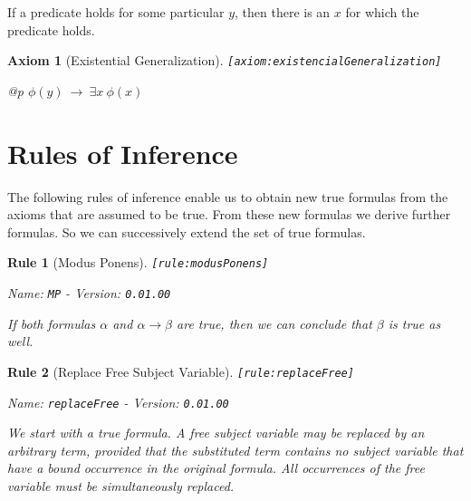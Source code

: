 \documentclass[a4paper,german,10pt,twoside]{book}
\newtheorem{ax}{Axiom}
\newtheorem{rul}{Rule}
\theoremstyle{definition}
\theoremstyle{remark}
\begin{document}
\par
If a predicate holds for some particular $y$, then there is an $x$ for which the predicate holds.

\begin{ax}[Existential Generalization]
\label{axiom:existencialGeneralization} \hypertarget{axiom:existencialGeneralization}{}
{\tt \tiny [\verb]axiom:existencialGeneralization]]}
\mbox{}
\begin{longtable}{{@{\extracolsep{\fill}}p{\linewidth}}}
\centering $\phi(y)\ \rightarrow\ \exists x\ \phi(x)$
\end{longtable}

\end{ax}


\section{Rules of Inference} \label{chapter5_section2} \hypertarget{chapter5_section2}{}
The following rules of inference enable us to obtain new true formulas from the axioms that are assumed to be true. From these new formulas we derive further formulas. So we can successively extend the set of true formulas.

\begin{rul}[Modus Ponens]
\label{rule:modusPonens} \hypertarget{rule:modusPonens}{}
{\tt \tiny [\verb]rule:modusPonens]]}

\par
{\em   Name: \verb]MP]  -  Version: \verb]0.01.00]}


If both formulas $\alpha$ and $\alpha \rightarrow \beta$ are true, then we can conclude that $\beta$ is true as well.
\end{rul}


\begin{rul}[Replace Free Subject Variable]
\label{rule:replaceFree} \hypertarget{rule:replaceFree}{}
{\tt \tiny [\verb]rule:replaceFree]]}

\par
{\em   Name: \verb]replaceFree]  -  Version: \verb]0.01.00]}


We start with a true formula.
A free subject variable may be replaced by an arbitrary term, provided that the substituted term contains no subject variable that have a bound occurrence in the original formula. All occurrences of the free variable must be simultaneously replaced.
\end{rul}
\end{document}

